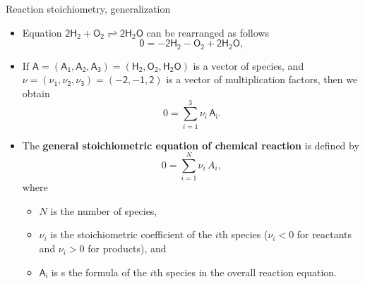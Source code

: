\begin{frame}{Reaction stoichiometry, generalization}
	\footnotesize
	\vskip 5pt
	\begin{itemize}
		\item Equation $\mathsf{2 H_2 + O_2 \rightleftharpoons 2H_2O}$ can be rearranged as follows
	    \[\mathsf{0 = - 2 H_2 - O_2 + 2H_2O},\] 
	    \vskip -5pt
	    \pause
	    \item If $ \mathsf{A = (A_1, A_2, A_3) =(H_2, O_2, H_2O)}$ is a vector of species, and 
	     $\mathsf{\nu = (\nu_1, \nu_2, \nu_3) = (-2, -1, 2)}$ is a vector of multiplication factors, 
	     then we obtain
	    \[0 = \sum_{i=1}^{3} \nu_i \,  \mathsf{A_i}.\]
	    \vskip -5pt
	    \pause
		\item The \alert{\textbf{general stoichiometric equation of chemical reaction}} is defined by
		\[\boxed{0 = \sum_{i=1}^{N} \nu_i \, A_i,}\]
		\vskip -5pt
		where 
			\begin{itemize}
			\item $N$ is the number of species, 
			\item $\nu_i$ is the stoichiometric coefficient of the $i$th species 
			($\nu_i < 0$ for reactants and $\nu_i >0$ for products), and 
		    \item  $ \mathsf{A_i}$ is s the formula of the $i$th species in the overall reaction equation.
	    	\end{itemize}
	\end{itemize}
\end{frame}
%
%
